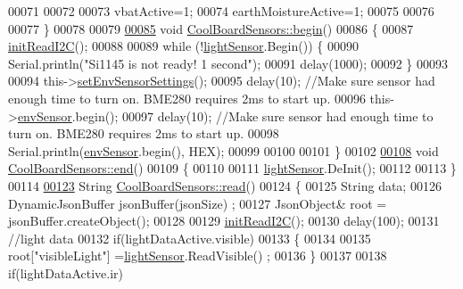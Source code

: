 \begin{DoxyCode}
00071 
00072 
00073     vbatActive=1;
00074     earthMoistureActive=1;
00075 
00076 
00077 \}
00078 
00079 
\hyperlink{class_cool_board_sensors_a97095823ef7c8f5290812f1405b966b3}{00085} \textcolor{keywordtype}{void} \hyperlink{class_cool_board_sensors_a97095823ef7c8f5290812f1405b966b3}{CoolBoardSensors::begin}()
00086 \{       
00087     \hyperlink{class_cool_board_sensors_acad6a8418c66d36868caca23c844ecb6}{initReadI2C}();
00088 
00089     \textcolor{keywordflow}{while} (!\hyperlink{class_cool_board_sensors_a3e397300fb707dd193e909a757bf6102}{lightSensor}.Begin()) \{
00090       Serial.println(\textcolor{stringliteral}{"Si1145 is not ready!  1 second"});
00091       delay(1000);
00092     \}
00093      
00094     this->\hyperlink{class_cool_board_sensors_a406307ffd70272282d91479c7ed8d66f}{setEnvSensorSettings}();
00095     delay(10);  \textcolor{comment}{//Make sure sensor had enough time to turn on. BME280 requires 2ms to start up.}
00096     this->\hyperlink{class_cool_board_sensors_a868e38985e9a2412829fa2790ca13e2e}{envSensor}.begin();
00097     delay(10);  \textcolor{comment}{//Make sure sensor had enough time to turn on. BME280 requires 2ms to start up.}
00098     Serial.println(\hyperlink{class_cool_board_sensors_a868e38985e9a2412829fa2790ca13e2e}{envSensor}.begin(), HEX);
00099 
00100 
00101 \}
00102 
\hyperlink{class_cool_board_sensors_a4902b69f6e628bd6557193758fdd2bae}{00108} \textcolor{keywordtype}{void} \hyperlink{class_cool_board_sensors_a4902b69f6e628bd6557193758fdd2bae}{CoolBoardSensors::end}()
00109 \{
00110 
00111     \hyperlink{class_cool_board_sensors_a3e397300fb707dd193e909a757bf6102}{lightSensor}.DeInit();
00112 
00113 \}
00114 
\hyperlink{class_cool_board_sensors_a91badb2539d91fda8679f2a597874c48}{00123} String \hyperlink{class_cool_board_sensors_a91badb2539d91fda8679f2a597874c48}{CoolBoardSensors::read}()
00124 \{
00125     String data;
00126     DynamicJsonBuffer  jsonBuffer(jsonSize) ;
00127     JsonObject& root = jsonBuffer.createObject();
00128     
00129     \hyperlink{class_cool_board_sensors_acad6a8418c66d36868caca23c844ecb6}{initReadI2C}();
00130     delay(100);
00131     \textcolor{comment}{//light data}
00132     \textcolor{keywordflow}{if}(lightDataActive.visible)
00133     \{
00134 
00135         root[\textcolor{stringliteral}{"visibleLight"}] =\hyperlink{class_cool_board_sensors_a3e397300fb707dd193e909a757bf6102}{lightSensor}.ReadVisible() ;
00136     \}
00137     
00138     \textcolor{keywordflow}{if}(lightDataActive.ir)

\end{DoxyCode}
